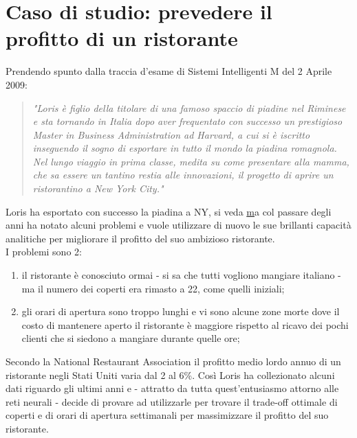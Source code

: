 \section{Caso di studio: prevedere il profitto di un ristorante}
Prendendo spunto dalla traccia d'esame di Sistemi Intelligenti M del 2 Aprile 2009:
\begin{quote}
\textit{"Loris è figlio della titolare di una famoso spaccio di piadine nel Riminese e sta tornando in Italia
dopo aver frequentato con successo un prestigioso Master in Business Administration ad Harvard, a
cui si è iscritto inseguendo il sogno di esportare in tutto il mondo la piadina romagnola. Nel lungo
viaggio in prima classe, medita su come presentare alla mamma, che sa essere un tantino restia alle
innovazioni, il progetto di aprire un ristorantino a New York City."}
\end{quote}
Loris ha esportato con successo la piadina a NY, si veda \parencite{WGradisca} \href{www.gradiscanyc.com} ma col passare degli anni ha notato alcuni problemi e vuole utilizzare di nuovo le sue brillanti capacità analitiche per migliorare il profitto del suo ambizioso ristorante. \\
I problemi sono 2: 
\begin{enumerate}
\item il ristorante è conosciuto ormai - si sa che tutti vogliono mangiare italiano - ma il numero dei coperti era rimasto a 22, come quelli iniziali; 
\item gli orari di apertura sono troppo lunghi e vi sono alcune zone morte dove il costo di mantenere aperto il ristorante è maggiore rispetto al ricavo dei pochi clienti che si siedono a mangiare durante quelle ore; 
\end{enumerate}
Secondo la National Restaurant Association\parencite{WProfit} \parencite{WRRG} il profitto medio lordo annuo di un ristorante negli Stati Uniti varia dal 2 al 6\%. Così Loris ha collezionato alcuni dati riguardo gli ultimi anni e - attratto da tutta quest'entusiasmo attorno alle reti neurali - decide di provare ad utilizzarle per trovare il trade-off ottimale di coperti e di orari di apertura settimanali per massimizzare il profitto del suo ristorante. 


